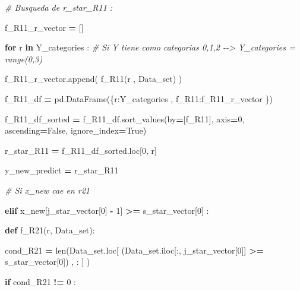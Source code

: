 \documentclass[
  11pt,
  a4paper,
]{article}
\newenvironment{Shaded}{\begin{snugshade}}{\end{snugshade}}
\newcommand{\BuiltInTok}[1]{#1}
\newcommand{\CommentTok}[1]{\textcolor[rgb]{0.56,0.35,0.01}{\textit{#1}}}
\newcommand{\ControlFlowTok}[1]{\textcolor[rgb]{0.13,0.29,0.53}{\textbf{#1}}}
\newcommand{\DecValTok}[1]{\textcolor[rgb]{0.00,0.00,0.81}{#1}}
\newcommand{\KeywordTok}[1]{\textcolor[rgb]{0.13,0.29,0.53}{\textbf{#1}}}
\newcommand{\NormalTok}[1]{#1}
\newcommand{\OperatorTok}[1]{\textcolor[rgb]{0.81,0.36,0.00}{\textbf{#1}}}
\newcommand{\StringTok}[1]{\textcolor[rgb]{0.31,0.60,0.02}{#1}}
\newcommand{\VariableTok}[1]{\textcolor[rgb]{0.00,0.00,0.00}{#1}}
\begin{document}
\begin{Shaded}
\begin{Highlighting}[]
                \CommentTok{\# Busqueda de r\_star\_R11 :}

\NormalTok{                f\_R11\_r\_vector }\OperatorTok{=}\NormalTok{ []}

                \ControlFlowTok{for}\NormalTok{ r }\KeywordTok{in}\NormalTok{ Y\_categories :  }\CommentTok{\# Si Y tiene como categorias 0,1,2 {-}{-}\textgreater{} Y\_categories = range(0,3)}

\NormalTok{                    f\_R11\_r\_vector.append( f\_R11(r , Data\_set) )}

\NormalTok{                f\_R11\_df }\OperatorTok{=}\NormalTok{ pd.DataFrame(\{}\StringTok{\textquotesingle{}r\textquotesingle{}}\NormalTok{:Y\_categories  , }\StringTok{\textquotesingle{}f\_R11\textquotesingle{}}\NormalTok{:f\_R11\_r\_vector \})}
        
\NormalTok{                f\_R11\_df\_sorted }\OperatorTok{=}\NormalTok{ f\_R11\_df.sort\_values(by}\OperatorTok{=}\NormalTok{[}\StringTok{\textquotesingle{}f\_R11\textquotesingle{}}\NormalTok{], axis}\OperatorTok{=}\DecValTok{0}\NormalTok{, ascending}\OperatorTok{=}\VariableTok{False}\NormalTok{, ignore\_index}\OperatorTok{=}\VariableTok{True}\NormalTok{)}

\NormalTok{                r\_star\_R11 }\OperatorTok{=}\NormalTok{ f\_R11\_df\_sorted.loc[}\DecValTok{0}\NormalTok{, }\StringTok{\textquotesingle{}r\textquotesingle{}}\NormalTok{]}

\NormalTok{                y\_new\_predict }\OperatorTok{=}\NormalTok{ r\_star\_R11 }

                
                
            \CommentTok{\# Si x\_new cae en r21}

            \ControlFlowTok{elif}\NormalTok{ x\_new[j\_star\_vector[}\DecValTok{0}\NormalTok{] }\OperatorTok{{-}} \DecValTok{1}\NormalTok{] }\OperatorTok{\textgreater{}=}\NormalTok{ s\_star\_vector[}\DecValTok{0}\NormalTok{] :  }
                
                
                \KeywordTok{def}\NormalTok{ f\_R21(r, Data\_set):}

\NormalTok{                    cond\_R21 }\OperatorTok{=} \BuiltInTok{len}\NormalTok{(Data\_set.loc[ (Data\_set.iloc[:, j\_star\_vector[}\DecValTok{0}\NormalTok{]] }\OperatorTok{\textgreater{}=}\NormalTok{ s\_star\_vector[}\DecValTok{0}\NormalTok{]) , : ] )}

                    \ControlFlowTok{if}\NormalTok{ cond\_R21 }\OperatorTok{!=} \DecValTok{0}\NormalTok{ :}


\end{Highlighting}
\end{Shaded}
\end{document}

